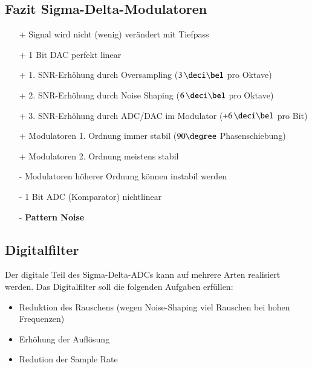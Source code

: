 \subsection{Fazit Sigma-Delta-Modulatoren}

\begin{minipage}[t]{0.48\columnwidth}
    \begin{itemize}
        \item[+] Signal wird nicht (wenig) verändert mit Tiefpass
        \item[+] 1 Bit DAC perfekt linear 
        \item[+] 1. SNR-Erhöhung durch Oversampling ($3 \, \deci \bel$ pro Oktave)
        \item[+] 2. SNR-Erhöhung durch Noise Shaping ($6 \, \deci \bel$ pro Oktave)
        \item[+] 3. SNR-Erhöhung durch ADC/DAC im Modulator ($+6 \, \deci \bel$ pro Bit)
    \end{itemize}
\end{minipage}
\hfill
\begin{minipage}[t]{0.48\columnwidth}
    \begin{itemize}

        \item[+] Modulatoren 1. Ordnung immer stabil ($90 \degree$ Phasenschiebung)
        \item[+] Modulatoren 2. Ordnung meistens stabil
        \item[-] Modulatoren höherer Ordnung können instabil werden  
        \item[-] 1 Bit ADC (Komparator) nichtlinear
        \item[-] \textbf{Pattern Noise} 
    \end{itemize}
\end{minipage}


\subsection{Digitalfilter}

Der digitale Teil des Sigma-Delta-ADCs kann auf mehrere Arten realisiert werden.  Das Digitalfilter soll die folgenden Aufgaben
erfüllen:

\begin{minipage}[t]{0.55\columnwidth}
    \begin{itemize}
        \item Reduktion des Rauschens (wegen Noise-Shaping viel Rauschen bei hohen Frequenzen)
    \end{itemize}
\end{minipage}
\hfill
\begin{minipage}[t]{0.42\columnwidth}
    \begin{itemize}
        \item Erhöhung der Auflösung
        \item Redution der Sample Rate
    \end{itemize}
\end{minipage}


